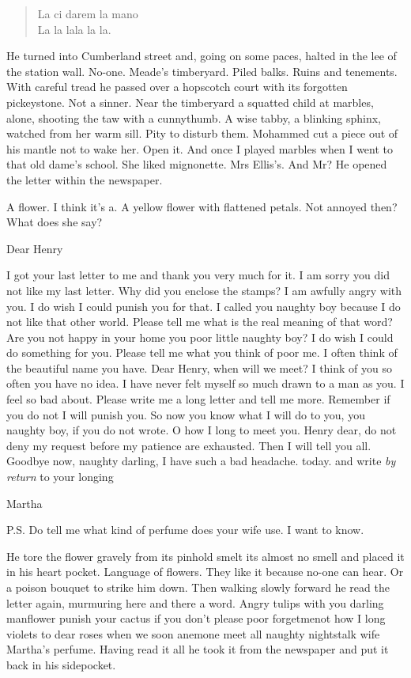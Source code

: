 \begin{verse}
    La ci darem la mano \\
    La la lala la la.
\end{verse}


He turned into Cumberland street
and, going on some paces,
halted in the lee of the station wall.
No-one.
Meade's timberyard.
Piled balks.
Ruins and tenements.
With careful tread
he passed over a hopscotch court with its forgotten pickeystone.
Not a sinner.
Near the timberyard a squatted child at marbles,
alone,
shooting the taw with a cunnythumb.
A wise tabby, a blinking sphinx,
watched from her warm sill.
Pity to disturb them.
Mohammed cut a piece out of his mantle not to wake her.
Open it.
And once I played marbles when I went to that old dame's school.
She liked mignonette.
Mrs Ellis's.
And Mr?
He opened the letter within the newspaper.

A flower.
I think it's a.
A yellow flower with flattened petals.
Not annoyed then?
What does she say?


    Dear Henry

I got your last letter to me and thank you very much for it.
I am sorry you did not like my last letter.
Why did you enclose the stamps?
I am awfully angry with you.
I do wish I could punish you for that.
I called you naughty boy
because I do not like that other world.
Please tell me what is the real meaning of that word?
Are you not happy in your home
you poor little naughty boy?
I do wish I could do something for you.
Please tell me what you think of poor me.
I often think of the beautiful name you have.
Dear Henry,
when will we meet?
I think of you so often
you have no idea.
I have never felt myself so much drawn to a man as you.
I feel so bad about.
Please write me a long letter and tell me more.
Remember if you do not
I will punish you.
So now you know what I will do to you,
you naughty boy, if you do not wrote.
O how I long to meet you.
Henry dear, do not deny my request before my patience are exhausted.
Then I will tell you all.
Goodbye now, naughty darling,
I have such a bad headache.
today.
and write \emph{by return} to your longing


    Martha

P.S. Do tell me what kind of perfume does your wife use.
I want to know.


He tore the flower gravely from its pinhold
smelt its almost no smell
and placed it in his heart pocket.
Language of flowers.
They like it
because no-one can hear.
Or a poison bouquet to strike him down.
Then walking slowly forward
he read the letter again,
murmuring here and there a word.
Angry tulips with you darling manflower
punish your cactus if you don't
please poor forgetmenot
how I long violets to dear roses
when we
soon anemone meet
all naughty nightstalk
wife Martha's perfume.
Having read it all
he took it from the newspaper and put it back in his sidepocket.

